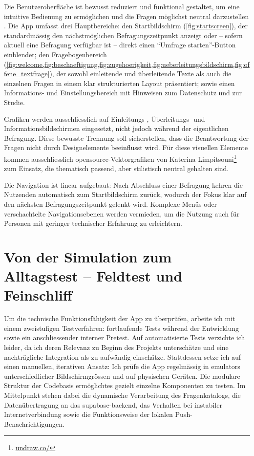 Die Benutzeroberfläche ist bewusst reduziert und funktional gestaltet, um eine intuitive Bedienung zu ermöglichen und die Fragen möglichst neutral darzustellen \parencite{rogersInteractionDesignHumancomputer2023}. Die App umfasst drei Hauptbereiche: den Startbildschirm (\cref{fig:startscreen}), der standardmässig den nächstmöglichen Befragungszeitpunkt anzeigt oder -- sofern aktuell eine Befragung verfügbar ist -- direkt einen \enquote{Umfrage starten}-Button einblendet; den Fragebogenbereich (\cref{fig:welcome,fig:beschaeftigung,fig:zugehoerigkeit,fig:ueberleitungsbildschirm,fig:offene_textfrage}), der sowohl einleitende und überleitende Texte als auch die einzelnen Fragen in einem klar strukturierten Layout präsentiert; sowie einen Informations- und Einstellungsbereich mit Hinweisen zum Datenschutz und zur Studie.

Grafiken werden ausschliesslich auf Einleitungs-, Überleitungs- und Informationsbildschirmen eingesetzt, nicht jedoch während der eigentlichen Befragung. Diese bewusste Trennung soll sicherstellen, dass die Beantwortung der Fragen nicht durch Designelemente beeinflusst wird. Für diese visuellen Elemente kommen ausschliesslich \gls{opensource}-Vektorgrafiken von Katerina Limpitsouni\footnote{\href{https://undraw.co/}{undraw.co/}} zum Einsatz, die thematisch passend, aber stilistisch neutral gehalten sind.

Die Navigation ist linear aufgebaut: Nach Abschluss einer Befragung kehren die Nutzenden automatisch zum Startbildschirm zurück, wodurch der Fokus klar auf den nächsten Befragungszeitpunkt gelenkt wird. Komplexe Menüs oder verschachtelte Navigationsebenen werden vermieden, um die Nutzung auch für Personen mit geringer technischer Erfahrung zu erleichtern.

\section{Von der Simulation zum Alltagstest -- Feldtest und Feinschliff}
\label{sec:app_entwicklung_feldtest}

Um die technische Funktionsfähigkeit der App zu überprüfen, arbeite ich mit einem zweistufigen Testverfahren: fortlaufende Tests während der Entwicklung sowie ein anschliessender interner Pretest. Auf automatisierte Tests verzichte ich leider, da ich deren Relevanz zu Beginn des Projekts unterschätze und eine nachträgliche Integration als zu aufwändig einschätze. Stattdessen setze ich auf einen manuellen, iterativen Ansatz: Ich prüfe die App regelmässig in \glspl{emulator} unterschiedlicher Bildschirmgrössen und auf physischen Geräten. Die modulare Struktur der Codebasis ermöglichtes gezielt einzelne Komponenten zu testen. Im Mittelpunkt stehen dabei die dynamische Verarbeitung des Fragenkatalogs, die Datenübertragung an das \gls{supabase}-\gls{backend}, das Verhalten bei instabiler Internetverbindung sowie die Funktionsweise der lokalen Push-Benachrichtigungen.

